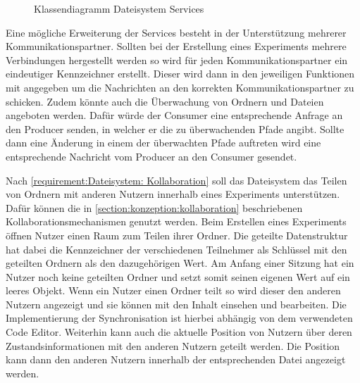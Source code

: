 \begin{figure}[tbp]
    \centering
    \caption{Klassendiagramm Dateisystem Services}
    \label{figure:klassendiagramm-dateisystem-services}
\end{figure}

Eine mögliche Erweiterung der Services besteht in der Unterstützung mehrerer Kommunikationspartner. Sollten bei der Erstellung eines Experiments mehrere Verbindungen hergestellt werden so wird für jeden Kommunikationspartner ein eindeutiger Kennzeichner erstellt. Dieser wird dann in den jeweiligen Funktionen mit angegeben um die Nachrichten an den korrekten Kommunikationspartner zu schicken. Zudem könnte auch die Überwachung von Ordnern und Dateien angeboten werden. Dafür würde der Consumer eine entsprechende Anfrage an den Producer senden, in welcher er die zu überwachenden Pfade angibt. Sollte dann eine Änderung in einem der überwachten Pfade auftreten wird eine entsprechende Nachricht vom Producer an den Consumer gesendet.

Nach \autoref{requirement:Dateisystem: Kollaboration} soll das Dateisystem das Teilen von Ordnern mit anderen Nutzern innerhalb eines Experiments unterstützen. Dafür können die in \autoref{section:konzeption:kollaboration} beschriebenen Kollaborationsmechanismen genutzt werden. Beim Erstellen eines Experiments öffnen Nutzer einen Raum zum Teilen ihrer Ordner. Die geteilte Datenstruktur hat dabei die Kennzeichner der verschiedenen Teilnehmer als Schlüssel mit den geteilten Ordnern als den dazugehörigen Wert. Am Anfang einer Sitzung hat ein Nutzer noch keine geteilten Ordner und setzt somit seinen eigenen Wert auf ein leeres Objekt. Wenn ein Nutzer einen Ordner teilt so wird dieser den anderen Nutzern angezeigt und sie können mit den Inhalt einsehen und bearbeiten. Die Implementierung der Synchronisation ist hierbei abhängig von dem verwendeten Code Editor. Weiterhin kann auch die aktuelle Position von Nutzern über deren Zustandsinformationen mit den anderen Nutzern geteilt werden. Die Position kann dann den anderen Nutzern innerhalb der entsprechenden Datei angezeigt werden.

